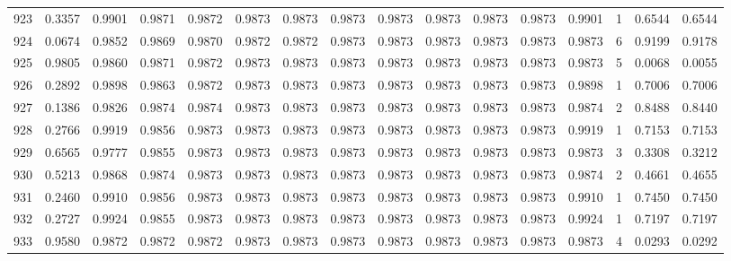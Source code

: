 \begin{tabular}{lrrrrrrrrrrrrrrr}
923 &      0.3357 &  0.9901 &  0.9871 &  0.9872 &  0.9873 &  0.9873 &  0.9873 &  0.9873 &  0.9873 &  0.9873 &   0.9873 &     0.9901 &      1 &                    0.6544 &                     0.6544 \\
924 &      0.0674 &  0.9852 &  0.9869 &  0.9870 &  0.9872 &  0.9872 &  0.9873 &  0.9873 &  0.9873 &  0.9873 &   0.9873 &     0.9873 &      6 &                    0.9199 &                     0.9178 \\
925 &      0.9805 &  0.9860 &  0.9871 &  0.9872 &  0.9873 &  0.9873 &  0.9873 &  0.9873 &  0.9873 &  0.9873 &   0.9873 &     0.9873 &      5 &                    0.0068 &                     0.0055 \\
926 &      0.2892 &  0.9898 &  0.9863 &  0.9872 &  0.9873 &  0.9873 &  0.9873 &  0.9873 &  0.9873 &  0.9873 &   0.9873 &     0.9898 &      1 &                    0.7006 &                     0.7006 \\
927 &      0.1386 &  0.9826 &  0.9874 &  0.9874 &  0.9873 &  0.9873 &  0.9873 &  0.9873 &  0.9873 &  0.9873 &   0.9873 &     0.9874 &      2 &                    0.8488 &                     0.8440 \\
928 &      0.2766 &  0.9919 &  0.9856 &  0.9873 &  0.9873 &  0.9873 &  0.9873 &  0.9873 &  0.9873 &  0.9873 &   0.9873 &     0.9919 &      1 &                    0.7153 &                     0.7153 \\
929 &      0.6565 &  0.9777 &  0.9855 &  0.9873 &  0.9873 &  0.9873 &  0.9873 &  0.9873 &  0.9873 &  0.9873 &   0.9873 &     0.9873 &      3 &                    0.3308 &                     0.3212 \\
930 &      0.5213 &  0.9868 &  0.9874 &  0.9873 &  0.9873 &  0.9873 &  0.9873 &  0.9873 &  0.9873 &  0.9873 &   0.9873 &     0.9874 &      2 &                    0.4661 &                     0.4655 \\
931 &      0.2460 &  0.9910 &  0.9856 &  0.9873 &  0.9873 &  0.9873 &  0.9873 &  0.9873 &  0.9873 &  0.9873 &   0.9873 &     0.9910 &      1 &                    0.7450 &                     0.7450 \\
932 &      0.2727 &  0.9924 &  0.9855 &  0.9873 &  0.9873 &  0.9873 &  0.9873 &  0.9873 &  0.9873 &  0.9873 &   0.9873 &     0.9924 &      1 &                    0.7197 &                     0.7197 \\
933 &      0.9580 &  0.9872 &  0.9872 &  0.9872 &  0.9873 &  0.9873 &  0.9873 &  0.9873 &  0.9873 &  0.9873 &   0.9873 &     0.9873 &      4 &                    0.0293 &                     0.0292 \\

\end{tabular}
